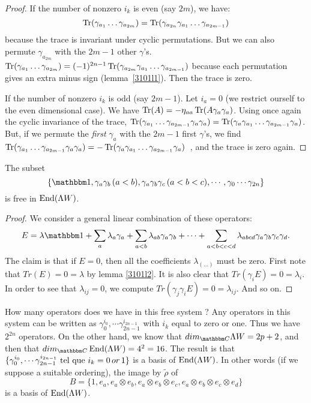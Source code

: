 \begin{proof}
 If the number of nonzero $i_k$ is even (say $2m$), we have:
\[
	\operatorname{Tr}(\gamma_{a_1}\ldots\gamma_{a_{2m}})=\operatorname{Tr}(\gamma_{a_{2n}}\gamma_{a_1}\ldots\gamma_{a_{2m-1}})
\] 
because the trace is invariant under cyclic permutations. But we can also permute $\gamma_{a_{2m}}$ with the $2m-1$ other $\gamma$'s.  $\operatorname{Tr}(\gamma_{a_1}\ldots\gamma_{a_{2m}})=(-1)^{2n-1}\operatorname{Tr}(\gamma_{a_{2m}}\gamma_{a_1}\ldots\gamma_{a_{2m-1}})$ because each permutation gives an extra minus sign (\hbox{lemma \ref{3101l1}}). Then the trace is zero.

If the number of nonzero $i_k$ is odd (say $2m-1$). Let $i_a=0$ (we restrict ourself to the even dimensional case). We have $\operatorname{Tr}(A)=-\eta_{aa}\operatorname{Tr}(A\gamma_a\gamma_a)$. Using once again the cyclic invariance of the trace, $\operatorname{Tr}(\gamma_{a_1}\ldots\gamma_{a_{2m-1}}\gamma_a\gamma_a)=\operatorname{Tr}(\gamma_a\gamma_{a_1}\ldots\gamma_{a_{2m-1}}\gamma_a)$. But, if we permute the \emph{first} $\gamma_a$ with the $2m-1$ first $\gamma$'s, we find \hbox{$\operatorname{Tr}(\gamma_{a_1}\ldots\gamma_{a_{2m-1}}\gamma_a\gamma_a)=-\operatorname{Tr}(\gamma_a\gamma_{a_1}\ldots\gamma_{a_{2m-1}}\gamma_a)$ }, and the trace is zero again.
\end{proof}

\begin{proposition}
The subset
\[
	\left\{\mtu,\dga{a}{b}\,(a<b),\tga{a}{b}{c}\,(a<b<c), \cdots, \gamma_{0}\cdots\gamma_{2n} \right\}
\]
 is free in $\operatorname{End}(\Lambda W)$.
\end{proposition}

\begin{proof}
We consider a general linear combination of these operators:
\[
 E=\lambda\mtu+\sum_a\lambda_a\gamma_a+\sum_{a<b}\lambda_{ab}\dga{a}{b}+\cdots+
 \sum_{a<b<c<d}\lambda_{abcd}\qga{a}{b}{c}{d}.
\]
The claim is that if $E=0$, then all the coefficients $\lambda_{(\ldots)}$ must be zero. First note that $Tr(E)=0=\lambda$ by lemma \ref{3101l2}. It is also clear that $Tr(\gamma_iE)=0=\lambda_i$. In order to see that $\lambda_{ij}=0$, we compute $Tr(\gamma_j\gamma_iE)=0=\lambda_{ij}$. And so on.
\end{proof}

How many operators does we have in this free system ? Any operators in this system can be written as $\gamma_{0}^{i_{0}},\cdots\gamma^{i_{2n-1}}_{2n-1}$ with $i_k$ equal to zero or one. Thus we have $2^{2n}$ operators. On the other hand, we know that $dim_{\eC}\Lambda W=2p+2$, and then that $dim_{\eC}\End(\Lambda W)=4^2=16$. The result is that $\{ \gamma_{0}^{i_{0}},\cdots\gamma^{i_{2n-1}}_{2n-1}  \text{ tel que } i_k=0\,or\,1\}$ is a basis of $\operatorname{End}(\Lambda W)$. In other words (if we suppose a suitable ordering), the image by $\tilde\rho$ of 
\[ 
B=\{1,e_a,e_a\otimes e_b,e_a\otimes e_b\otimes e_c,e_a\otimes e_b\otimes e_c\otimes e_d\}
\]
 is a basis of $\operatorname{End}(\Lambda W)$.

